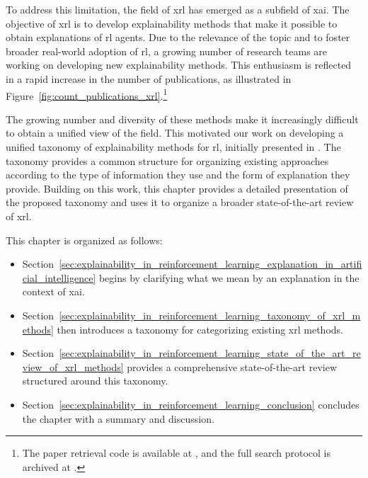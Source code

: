 To address this limitation, the field of \gls{xrl} has emerged as a subfield of \gls{xai}.
The objective of \gls{xrl} is to develop explainability methods that make it possible to obtain explanations of \gls{rl} agents.
Due to the relevance of the topic and to foster broader real-world adoption of \gls{rl}, a growing number of research teams are working on developing new explainability methods.
This enthusiasm is reflected in a rapid increase in the number of publications, as illustrated in Figure~\ref{fig:count_publications_xrl}.\footnote{The paper retrieval code is available at \LinkPaperRetrievalRepository, and the full search protocol is archived at \LinkPaperRetrievalProtocol.}



The growing number and diversity of these methods make it increasingly difficult to obtain a unified view of the field.
This motivated our work on developing a unified taxonomy of explainability methods for \gls{rl}, initially presented in \parencite{alaarabiou:hal-04685607}.
The taxonomy provides a common structure for organizing existing approaches according to the type of information they use and the form of explanation they provide.
Building on this work, this chapter provides a detailed presentation of the proposed taxonomy and uses it to organize a broader state-of-the-art review of \gls{xrl}.

This chapter is organized as follows:
\begin{itemize}
    \item Section~\ref{sec:explainability_in_reinforcement_learning_explanation_in_artificial_intelligence} begins by clarifying what we mean by an explanation in the context of \gls{xai}.
    \item Section~\ref{sec:explainability_in_reinforcement_learning_taxonomy_of_xrl_methods} then introduces a taxonomy for categorizing existing \gls{xrl} methods.
    \item Section~\ref{sec:explainability_in_reinforcement_learning_state_of_the_art_review_of_xrl_methods} provides a comprehensive state-of-the-art review structured around this taxonomy.
    \item Section~\ref{sec:explainability_in_reinforcement_learning_conclusion} concludes the chapter with a summary and discussion.
\end{itemize}




